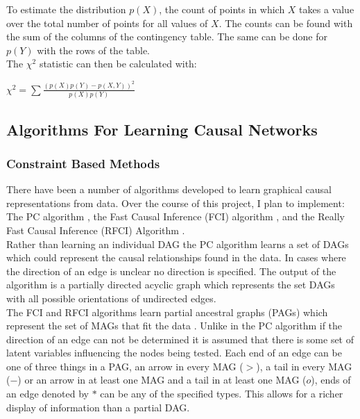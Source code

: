 \documentclass{article}
\begin{document}
To estimate the distribution $p(X)$, the count of points in which $X$ takes a value over the total number of points for all values of $X$. The counts can be found with the sum of the columns of the contingency table. The same can be done for $p(Y)$ with the rows of the table.\\

The $\chi^2$ statistic can then be calculated with:

\begin{center}
	$\chi^2 = \sum\frac{(p(X)p(Y)-p(X,Y))^2}{p(X)p(Y)}$
\end{center}


\subsection{Algorithms For Learning Causal Networks}
\subsubsection{Constraint Based Methods}
 There have been a number of algorithms developed to learn graphical causal representations from data. Over the course of this project, I plan to implement: The PC algorithm \cite{spirtes1991algorithm}, the Fast Causal Inference (FCI) algorithm \cite{colombo2012learning}, and the Really Fast Causal Inference (RFCI) Algorithm \cite{colombo2012learning}.
\\

Rather than learning an individual DAG the PC algorithm learns a set of DAGs which could represent the causal relationships found in the data. In cases where the direction of an edge is unclear no direction is specified. The output of the algorithm is a partially directed acyclic graph which represents the set DAGs with all possible orientations of undirected edges\cite{spirtes1991algorithm}.
\\

The FCI and RFCI algorithms learn partial ancestral graphs (PAGs) which represent the set of MAGs that fit the data \cite{colombo2012learning}. Unlike in the PC algorithm if the direction of an edge can not be determined it is assumed that there is some set of latent variables influencing the nodes being tested. Each end of an edge can be one of three things in a PAG, an arrow in every MAG ($>$), a tail in every MAG ($-$) or an arrow in at least one MAG and a tail in at least one MAG ($o$), ends of an edge denoted by $*$ can be any of the specified types. This allows for a richer display of information than a partial DAG\cite{colombo2012learning}.
\\
\end{document}
